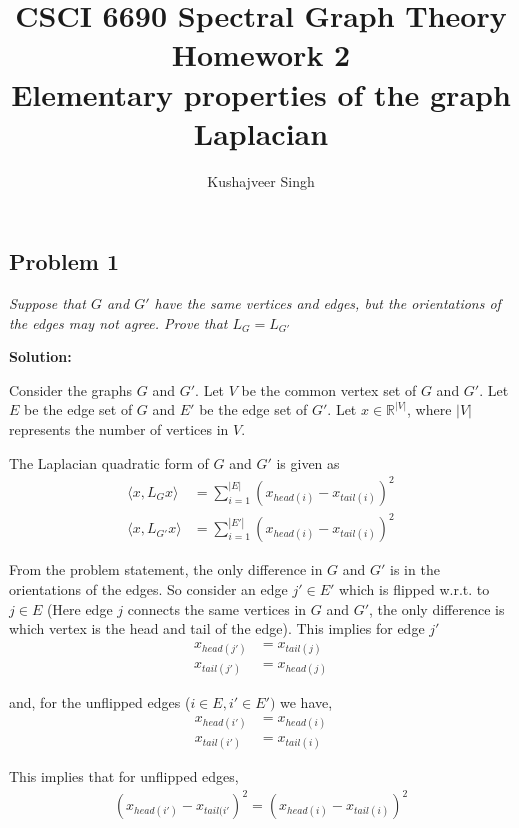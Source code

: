 \documentclass[12pt,a4paper]{article}
\title{CSCI 6690 Spectral Graph Theory Homework 2\\Elementary properties of the graph Laplacian}
\author{Kushajveer Singh}
\date{}
\begin{document}
\maketitle

\subsection*{Problem 1}
\textit{
    Suppose that $G$ and $G'$ have the same vertices and edges, but the orientations of the edges may not agree. Prove that $L_G = L_{G'}$
}

\noindent\textbf{Solution:}

Consider the graphs $G$ and $G'$. Let $V$ be the common vertex set of $G$ and $G'$. Let $E$ be the edge set of $G$ and $E'$ be the edge set of $G'$. Let $x \in \mathbb{R}^{|V|}$, where $|V|$ represents the number of vertices in $V$.

The Laplacian quadratic form of $G$ and $G'$ is given as
\begin{align}
    \langle x, L_Gx \rangle &= \sum \limits_{i=1}^{|E|} (x_{head(i)} - x_{tail(i)})^2 \label{eq:1} \\
    \langle x, L_{G'}x \rangle &= \sum \limits_{i=1}^{|E'|} (x_{head(i)} - x_{tail(i)})^2 \label{eq:2}
\end{align}

From the problem statement, the only difference in $G$ and $G'$ is in the orientations of the edges. So consider an edge $j' \in E'$ which is flipped w.r.t. to $j \in E$ (Here edge $j$ connects the same vertices in $G$ and $G'$, the only difference is which vertex is the head and tail of the edge). This implies for edge $j'$
\begin{align}
    x_{head(j')} &= x_{tail(j)} \label{eq:3}\\
    x_{tail(j')} &= x_{head(j)} \label{eq:4}
\end{align}

and, for the unflipped edges ($i \in E, i' \in E')$ we have,
\begin{align}
    x_{head(i')} &= x_{head(i)} \label{eq:5}\\
    x_{tail(i')} &= x_{tail(i)} \label{eq:6}
\end{align}

This implies that for unflipped edges,
\begin{align}
    (x_{head(i')} - x_{tail(i'})^2 = (x_{head(i)} - x_{tail(i)})^2 \label{eq:7}
\end{align}
\end{document}
